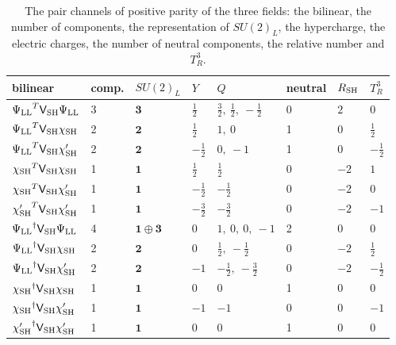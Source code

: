\documentclass[aps,prd,onecolumn,superscriptaddress,nofootinbib,floatfix,longbibliography]{revtex4-2}
\begin{document}
\begin{table}[!htbp]
\caption{\label{tab:channels}The pair channels of positive parity of the three fields: the bilinear, the number of components, the representation of $SU(2)_L$, the hypercharge, the electric charges, the number of neutral components, the relative number and $T^3_R$.}
\begingroup\centering\footnotesize\setlength{\tabcolsep}{4pt}
\begin{tabular}{llllllll}
\hline\hline
bilinear & comp. & $SU(2)_L$ & $Y$ & $Q$ & neutral & $R_{\rm SH}$ & $T^3_R$ \\ \hline
${\Psi_{\rm LL}}^T\mathsf V_{\rm SH}\Psi_{\rm LL}$ & 3 & $\mathbf 3$ & $\tfrac{1}{2}$ & $\tfrac{3}{2},\ \tfrac{1}{2},\ -\tfrac{1}{2}$ & 0 & $2$ & $0$ \\
${\Psi_{\rm LL}}^T\mathsf V_{\rm SH}\chi_{\rm SH}$ & 2 & $\mathbf 2$ & $\tfrac{1}{2}$ & $1,\ 0$ & 1 & $0$ & $\tfrac{1}{2}$ \\
${\Psi_{\rm LL}}^T\mathsf V_{\rm SH}\chi'_{\rm SH}$ & 2 & $\mathbf 2$ & $-\tfrac{1}{2}$ & $0,\ -1$ & 1 & $0$ & $-\tfrac{1}{2}$ \\
${\chi_{\rm SH}}^T\mathsf V_{\rm SH}\chi_{\rm SH}$ & 1 & $\mathbf 1$ & $\tfrac{1}{2}$ & $\tfrac{1}{2}$ & 0 & $-2$ & $1$ \\
${\chi_{\rm SH}}^T\mathsf V_{\rm SH}\chi'_{\rm SH}$ & 1 & $\mathbf 1$ & $-\tfrac{1}{2}$ & $-\tfrac{1}{2}$ & 0 & $-2$ & $0$ \\
${\chi'_{\rm SH}}^T\mathsf V_{\rm SH}\chi'_{\rm SH}$ & 1 & $\mathbf 1$ & $-\tfrac{3}{2}$ & $-\tfrac{3}{2}$ & 0 & $-2$ & $-1$ \\
${\Psi_{\rm LL}}^\dagger\mathsf V_{\rm SH}\Psi_{\rm LL}$ & 4 & $\mathbf 1\oplus\mathbf 3$ & $0$ & $1,\ 0,\ 0,\ -1$ & 2 & $0$ & $0$ \\
${\Psi_{\rm LL}}^\dagger\mathsf V_{\rm SH}\chi_{\rm SH}$ & 2 & $\mathbf 2$ & $0$ & $\tfrac{1}{2},\ -\tfrac{1}{2}$ & 0 & $-2$ & $\tfrac{1}{2}$ \\
${\Psi_{\rm LL}}^\dagger\mathsf V_{\rm SH}\chi'_{\rm SH}$ & 2 & $\mathbf 2$ & $-1$ & $-\tfrac{1}{2},\ -\tfrac{3}{2}$ & 0 & $-2$ & $-\tfrac{1}{2}$ \\
${\chi_{\rm SH}}^\dagger\mathsf V_{\rm SH}\chi_{\rm SH}$ & 1 & $\mathbf 1$ & $0$ & $0$ & 1 & $0$ & $0$ \\
${\chi_{\rm SH}}^\dagger\mathsf V_{\rm SH}\chi'_{\rm SH}$ & 1 & $\mathbf 1$ & $-1$ & $-1$ & 0 & $0$ & $-1$ \\
${\chi'_{\rm SH}}^\dagger\mathsf V_{\rm SH}\chi'_{\rm SH}$ & 1 & $\mathbf 1$ & $0$ & $0$ & 1 & $0$ & $0$ \\
\hline\hline
\end{tabular}\par
\endgroup
\end{table}
\end{document}
